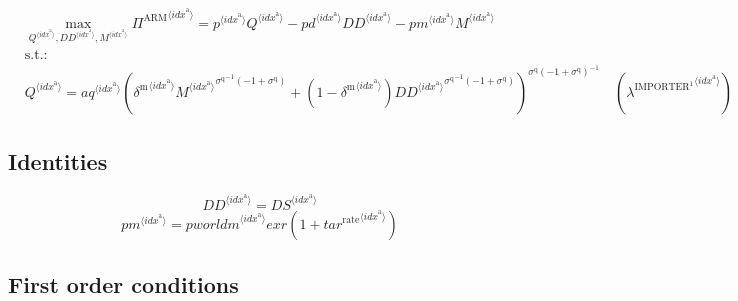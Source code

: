 \begin{align}
&\max_{{Q}^{\langle {i\!d\!x}^{\mathrm{a}}\rangle}, {{D\!D}}^{\langle {i\!d\!x}^{\mathrm{a}}\rangle}, {M}^{\langle {i\!d\!x}^{\mathrm{a}}\rangle}
} {\Pi^{\mathrm{ARM}}}^{\langle {i\!d\!x}^{\mathrm{a}}\rangle} = {{p}^{\langle {i\!d\!x}^{\mathrm{a}}\rangle}} {{Q}^{\langle {i\!d\!x}^{\mathrm{a}}\rangle}} - {{{p\!d}}^{\langle {i\!d\!x}^{\mathrm{a}}\rangle}} {{{D\!D}}^{\langle {i\!d\!x}^{\mathrm{a}}\rangle}} - {{{p\!m}}^{\langle {i\!d\!x}^{\mathrm{a}}\rangle}} {{M}^{\langle {i\!d\!x}^{\mathrm{a}}\rangle}}\\
&\mathrm{s.t.:}\nonumber\\
& {Q}^{\langle {i\!d\!x}^{\mathrm{a}}\rangle} = {{{a\!q}}^{\langle {i\!d\!x}^{\mathrm{a}}\rangle}} {\left({{\delta^{\mathrm{m}}}^{\langle {i\!d\!x}^{\mathrm{a}}\rangle}} {{{M}^{\langle {i\!d\!x}^{\mathrm{a}}\rangle}}^{{\sigma^{\mathrm{q}}}^{-1} \left(-1 + \sigma^{\mathrm{q}}\right)}} + \left(1 - {\delta^{\mathrm{m}}}^{\langle {i\!d\!x}^{\mathrm{a}}\rangle}\right) {{{{D\!D}}^{\langle {i\!d\!x}^{\mathrm{a}}\rangle}}^{{\sigma^{\mathrm{q}}}^{-1} \left(-1 + \sigma^{\mathrm{q}}\right)}}\right)^{{\sigma^{\mathrm{q}}} \left(-1 + \sigma^{\mathrm{q}}\right)^{-1}}} \quad \left({\lambda^{\mathrm{IMPORTER}^{\mathrm{1}}}}^{\langle {i\!d\!x}^{\mathrm{a}}\rangle}\right)
\end{align}


\subsection{Identities}

\begin{equation}
{{D\!D}}^{\langle {i\!d\!x}^{\mathrm{a}}\rangle} = {{D\!S}}^{\langle {i\!d\!x}^{\mathrm{a}}\rangle}
\end{equation}
\begin{equation}
{{p\!m}}^{\langle {i\!d\!x}^{\mathrm{a}}\rangle} = {{{p\!w\!o\!r\!l\!d\!m}}^{\langle {i\!d\!x}^{\mathrm{a}}\rangle}} {{e\!x\!r}} \left(1 + {{t\!a\!r}^{\mathrm{rate}}}^{\langle {i\!d\!x}^{\mathrm{a}}\rangle}\right)
\end{equation}


\subsection{First order conditions}

